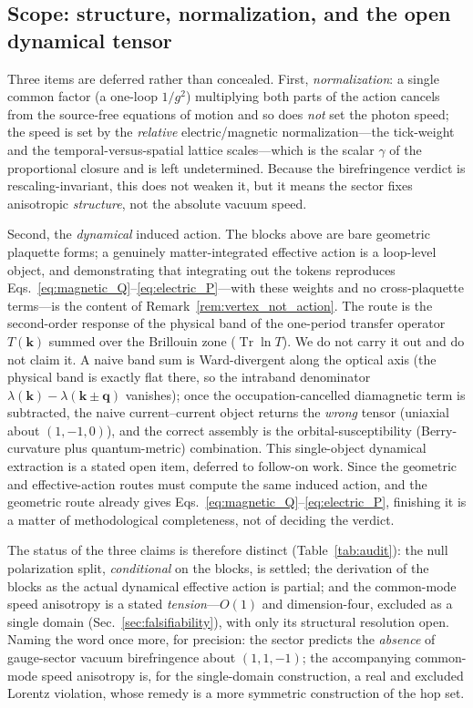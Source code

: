 \subsection{Scope: structure, normalization, and the open dynamical tensor}
\label{subsec:gauge_scope}

Three items are deferred rather than concealed. First, \emph{normalization}: a single
common factor (a one-loop $1/g^2$) multiplying both parts of the action cancels from
the source-free equations of motion and so does \emph{not} set the photon speed; the
speed is set by the \emph{relative} electric/magnetic normalization---the tick-weight
and the temporal-versus-spatial lattice scales---which is the scalar $\gamma$ of the
proportional closure and is left undetermined. Because the birefringence verdict is
rescaling-invariant, this does not weaken it, but it means the sector fixes
anisotropic \emph{structure}, not the absolute vacuum speed.

Second, the \emph{dynamical} induced action. The blocks above are bare geometric
plaquette forms; a genuinely matter-integrated effective action is a loop-level
object, and demonstrating that integrating out the tokens reproduces
Eqs.~\eqref{eq:magnetic_Q}--\eqref{eq:electric_P}---with these weights and no
cross-plaquette terms---is the content of Remark~\ref{rem:vertex_not_action}. The
route is the second-order response of the physical band of the one-period transfer
operator $T(\mathbf{k})$ summed over the Brillouin zone ($\operatorname{Tr}\ln T$). We
do not carry it out and do not claim it. A naive band sum is Ward-divergent along the
optical axis (the physical band is exactly flat there, so the intraband denominator
$\lambda(\mathbf{k})-\lambda(\mathbf{k}\pm\mathbf{q})$ vanishes); once the
occupation-cancelled diamagnetic term is subtracted, the naive current--current object
returns the \emph{wrong} tensor (uniaxial about $(1,-1,0)$), and the correct assembly
is the orbital-susceptibility (Berry-curvature plus quantum-metric) combination. This
single-object dynamical extraction is a stated open item, deferred to follow-on work.
Since the geometric and effective-action routes must compute the same induced action,
and the geometric route already gives Eqs.~\eqref{eq:magnetic_Q}--\eqref{eq:electric_P},
finishing it is a matter of methodological completeness, not of deciding the verdict.

The status of the three claims is therefore distinct (Table~\ref{tab:audit}): the null
polarization split, \emph{conditional} on the blocks, is settled; the derivation of the
blocks as the actual dynamical effective action is partial; and the common-mode speed
anisotropy is a stated \emph{tension}---$O(1)$ and dimension-four, excluded as a single
domain (Sec.~\ref{sec:falsifiability}), with only its structural resolution open. Naming
the word once more, for precision: the sector predicts the \emph{absence} of gauge-sector
vacuum birefringence about $(1,1,-1)$; the accompanying common-mode speed anisotropy is,
for the single-domain construction, a real and excluded Lorentz violation, whose remedy
is a more symmetric construction of the hop set.
